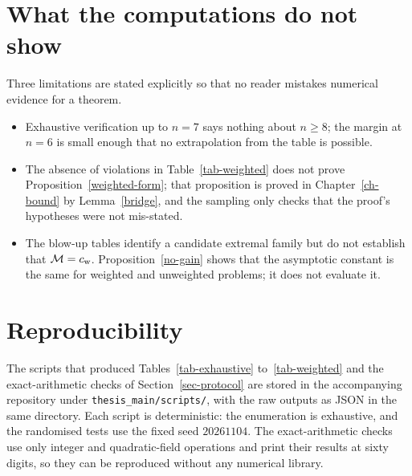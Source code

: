 \section{What the computations do not show}\label{sec-num-limits}
Three limitations are stated explicitly so that no reader mistakes numerical
evidence for a theorem.

\begin{itemize}[leftmargin=1.6em,itemsep=4pt]
\item Exhaustive verification up to $n=7$ says nothing about $n\ge8$; the
margin at $n=6$ is small enough that no extrapolation from the table is
possible.
\item The absence of violations in Table~\ref{tab-weighted} does not prove
Proposition~\ref{weighted-form}; that proposition is proved in
Chapter~\ref{ch-bound} by Lemma~\ref{bridge}, and the sampling only checks
that the proof's hypotheses were not mis-stated.
\item The blow-up tables identify a candidate extremal family but do not
establish that $\mathcal M=c_{\mathrm{w}}$. Proposition~\ref{no-gain} shows that the
asymptotic constant is the same for weighted and unweighted problems; it does
not evaluate it.
\end{itemize}

\section{Reproducibility}\label{sec-repro}
The scripts that produced Tables~\ref{tab-exhaustive}
to~\ref{tab-weighted} and the exact-arithmetic checks of
Section~\ref{sec-protocol} are stored in the accompanying repository under
\texttt{thesis\_main/scripts/}, with the raw outputs as JSON in the same
directory. Each script is deterministic: the enumeration is exhaustive, and
the randomised tests use the fixed seed $20261104$. The exact-arithmetic
checks use only integer and quadratic-field operations and print their results
at sixty digits, so they can be reproduced without any numerical library.
